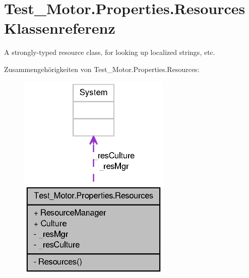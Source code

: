 \hypertarget{class_test___motor_1_1_properties_1_1_resources}{
\section{Test\_\-Motor.Properties.Resources Klassenreferenz}
\label{class_test___motor_1_1_properties_1_1_resources}
}


A strongly-\/typed resource class, for looking up localized strings, etc.  




Zusammengehörigkeiten von Test\_\-Motor.Properties.Resources:\nopagebreak
\begin{figure}[H]
\begin{center}
\leavevmode
\includegraphics[width=206pt]{class_test___motor_1_1_properties_1_1_resources__coll__graph}
\end{center}
\end{figure}
